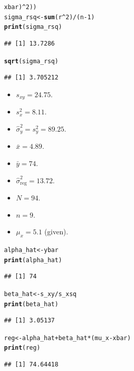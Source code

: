 \documentclass[oneside]{book}\usepackage[]{graphicx}\usepackage[dvipsnames,table,xcdraw]{xcolor}
\makeatletter
\newcommand{\hlnum}[1]{\textcolor[rgb]{0.686,0.059,0.569}{#1}}%
\newcommand{\hlopt}[1]{\textcolor[rgb]{0,0,0}{#1}}%
\newcommand{\hlstd}[1]{\textcolor[rgb]{0.345,0.345,0.345}{#1}}%
\newcommand{\hlkwb}[1]{\textcolor[rgb]{0.69,0.353,0.396}{#1}}%
\newcommand{\hlkwd}[1]{\textcolor[rgb]{0.737,0.353,0.396}{\textbf{#1}}}%
\newenvironment{kframe}{%
 \def\at@end@of@kframe{}%
 \ifinner\ifhmode%
  \def\at@end@of@kframe{\end{minipage}}%
  \begin{minipage}{\columnwidth}%
 \fi\fi%
 \def\FrameCommand##1{\hskip\@totalleftmargin \hskip-\fboxsep
 \colorbox{shadecolor}{##1}\hskip-\fboxsep
     \hskip-\linewidth \hskip-\@totalleftmargin \hskip\columnwidth}%
 \MakeFramed {\advance\hsize-\width
   \@totalleftmargin\z@ \linewidth\hsize
   \@setminipage}}%
 {\par\unskip\endMakeFramed%
 \at@end@of@kframe}
\newenvironment{knitrout}{}{} %
\makeatother
\begin{document}
\begin{knitrout}
\begin{kframe}
\begin{alltt}
  \hlstd{xbar)}\hlopt{^}\hlnum{2}\hlstd{))}
\hlstd{sigma_rsq} \hlkwb{<-} \hlkwd{sum}\hlstd{(r}\hlopt{^}\hlnum{2}\hlstd{)}\hlopt{/}\hlstd{(n} \hlopt{-} \hlnum{1}\hlstd{)}
\hlkwd{print}\hlstd{(sigma_rsq)}
\end{alltt}
\begin{verbatim}
## [1] 13.7286
\end{verbatim}
\begin{alltt}
\hlkwd{sqrt}\hlstd{(sigma_rsq)}
\end{alltt}
\begin{verbatim}
## [1] 3.705212
\end{verbatim}
\end{kframe}
\end{knitrout}
\begin{itemize}
    \item $s_{xy}=24.75$.
    \item $s_x^2=8.11$.
    \item $\hat{\sigma}_y^2=s_y^2=89.25$.
    \item $\bar{x}=4.89$.
    \item $\bar{y}=74$.
    \item $\hat{\sigma}_{\text{reg}}^2=13.72$.
    \item $N=94$.
    \item $n=9$.
    \item $\mu_x=5.1$ (given).
\end{itemize}
\begin{knitrout}
\color{fgcolor}\begin{kframe}
\begin{alltt}
\hlstd{alpha_hat} \hlkwb{<-} \hlstd{ybar}
\hlkwd{print}\hlstd{(alpha_hat)}
\end{alltt}
\begin{verbatim}
## [1] 74
\end{verbatim}
\begin{alltt}
\hlstd{beta_hat} \hlkwb{<-} \hlstd{s_xy}\hlopt{/}\hlstd{s_xsq}
\hlkwd{print}\hlstd{(beta_hat)}
\end{alltt}
\begin{verbatim}
## [1] 3.05137
\end{verbatim}
\begin{alltt}
\hlstd{reg} \hlkwb{<-} \hlstd{alpha_hat} \hlopt{+} \hlstd{beta_hat} \hlopt{*} \hlstd{(mu_x} \hlopt{-} \hlstd{xbar)}
\hlkwd{print}\hlstd{(reg)}
\end{alltt}
\begin{verbatim}
## [1] 74.64418
\end{verbatim}
\end{kframe}
\end{knitrout}
\end{document}
